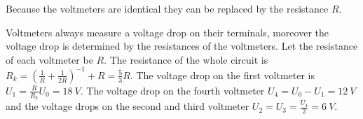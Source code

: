 \hinteng
Because the voltmeters are identical they can be replaced by the resistance $R$.

\solueng
Voltmeters always measure a voltage drop on their terminals, moreover the voltage drop is determined by the resistances of the voltmeters. Let the resistance of each voltmeter be $R$. The resistance of the whole circuit is $R_k=\left(\frac{1}{R}+\frac{1}{2R}\right)^{-1}+R=\frac{5}{3}R$. The voltage drop on the first voltmeter is $U_1=\frac{R}{R_k}U_0=\SI{18}{V}$. The voltage drop on the fourth voltmeter $U_4=U_0-U_1=\SI{12}{V}$ and the voltage drops on the second and third voltmeter $U_2=U_3=\frac{U_4}{2}=\SI{6}{V}$.
\probend